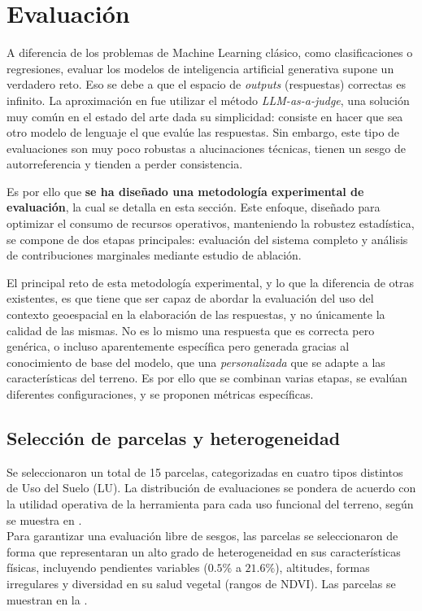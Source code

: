 
\section{Evaluación}

A diferencia de los problemas de Machine Learning clásico, como clasificaciones o regresiones, evaluar los modelos de inteligencia artificial generativa supone un verdadero reto. Eso se debe a que el espacio de \textit{outputs} (respuestas) correctas es infinito. La aproximación en \cite{mi-paper} fue utilizar el método \textit{LLM-as-a-judge}, una solución muy común en el estado del arte dada su simplicidad: consiste en hacer que sea otro modelo de lenguaje el que evalúe las respuestas. Sin embargo, este tipo de evaluaciones son muy poco robustas a alucinaciones técnicas, tienen un sesgo de autorreferencia y tienden a perder consistencia.

Es por ello que \textbf{se ha diseñado una metodología experimental de evaluación}, la cual se detalla en esta sección. Este enfoque, diseñado para optimizar el consumo de recursos operativos, manteniendo la robustez estadística, se compone de dos etapas principales: evaluación del sistema completo y análisis de contribuciones marginales mediante estudio de ablación.

El principal reto de esta metodología experimental, y lo que la diferencia de otras existentes, es que tiene que ser capaz de abordar la evaluación del uso del contexto geoespacial en la elaboración de las respuestas, y no únicamente la calidad de las mismas. No es lo mismo una respuesta que es correcta pero genérica, o incluso aparentemente específica pero generada gracias al conocimiento de base del modelo, que una \textit{personalizada} que se adapte a las características del terreno. Es por ello que se combinan varias etapas, se evalúan diferentes configuraciones, y se proponen métricas específicas. 

\subsection{Selección de parcelas y heterogeneidad}
Se seleccionaron un total de 15 parcelas, categorizadas en cuatro tipos distintos de Uso del Suelo (LU). La distribución de evaluaciones se pondera de acuerdo con la utilidad operativa de la herramienta para cada uso funcional del terreno, según se muestra en . \\

Para garantizar una evaluación libre de sesgos, las parcelas se seleccionaron de forma que representaran un alto grado de heterogeneidad en sus características físicas, incluyendo pendientes variables ($0.5\%$ a $21.6\%$), altitudes, formas irregulares y diversidad en su salud vegetal (rangos de NDVI). Las parcelas se muestran en la .



